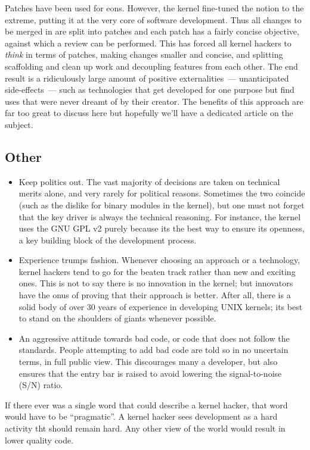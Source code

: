 \documentclass{memoir}
\begin{document}
Patches have been used for eons. However, the kernel fine-tuned the
notion to the extreme, putting it at the very core of software
development. Thus all changes to be merged in are split into patches
and each patch has a fairly concise objective, against which a review
can be performed. This has forced all kernel hackers to \emph{think}
in terms of patches, making changes smaller and concise, and splitting
scaffolding and clean up work and decoupling features from each
other. The end result is a ridiculously large amount of positive
externalities~--- unanticipated side-effects~--- such as technologies
that get developed for one purpose but find uses that were never
dreamt of by their creator. The benefits of this approach are far too
great to discuss here but hopefully we'll have a dedicated article on
the subject.

\subsection{Other}

\begin{itemize}
\item Keep politics out. The vast majority of decisions are taken on
  technical merits alone, and very rarely for political
  reasons. Sometimes the two coincide (such as the dislike for binary
  modules in the kernel), but one must not forget that the key driver
  is always the technical reasoning. For instance, the kernel uses the
  GNU GPL v2 purely because its the best way to ensure its openness, a
  key building block of the development process.
\item Experience trumps fashion. Whenever choosing an approach or a
  technology, kernel hackers tend to go for the beaten track rather
  than new and exciting ones. This is not to say there is no
  innovation in the kernel; but innovators have the onus of proving
  that their approach is better. After all, there is a solid body of
  over 30 years of experience in developing UNIX kernels; its best to
  stand on the shoulders of giants whenever possible.
\item An aggressive attitude towards bad code, or code that does not
  follow the standards. People attempting to add bad code are told so
  in no uncertain terms, in full public view. This discourages many a
  developer, but also ensures that the entry bar is raised to avoid
  lowering the signal-to-noise (S/N) ratio.
\end{itemize}

If there ever was a single word that could describe a kernel hacker,
that word would have to be ``pragmatic''. A kernel hacker sees
development as a hard activity tht should remain hard. Any other view
of the world would result in lower quality code.
\end{document}
